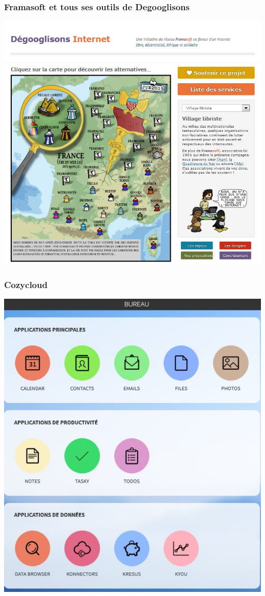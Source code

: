 \documentclass{beamer}
\begin{document}
\begin{frame}
\begin{center}
\frametitle{Framasoft et tous ses outils de Degooglisons}
\includegraphics[scale=0.6] {./images/framasoft_degogglisons.jpg}
\end{center}
\end{frame}
\begin{frame}
\begin{center}
\frametitle{Cozycloud}
\includegraphics[scale=0.6] {./images/Cozycloud.jpg}
\end{center}
\end{frame}
\end{document}
